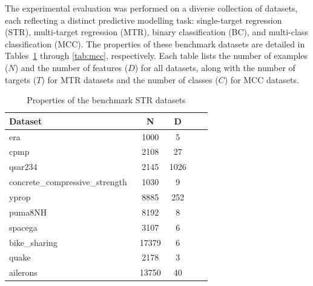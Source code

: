 \documentclass[3p,review,authoryear]{elsarticle}
\begin{document}
The experimental evaluation was performed on a diverse collection of datasets, each reflecting a distinct predictive modelling task: single-target regression (STR), multi-target regression (MTR), binary classification (BC), and multi-class classification (MCC).
The properties of these benchmark datasets are detailed in Tables~\ref{tab:str} through \ref{tab:mcc}, respectively.
Each table lists the number of examples (\(N\)) and the number of features (\(D\)) for all datasets, along with the number of targets (\(T\)) for MTR datasets and the number of classes (\(C\)) for MCC datasets.

\begin{table}[h!]
\centering
\caption{Properties of the benchmark STR datasets}
\label{tab:str}
\begin{tabular}{@{}lcccc@{}}
\toprule
\textbf{Dataset}   & \textbf{N} & \textbf{D} \\ \midrule
era~\citep{openml}                  & 1000         & 5          \\
cpmp~\citep{openml}                     & 2108         & 27          \\
qsar234~\citep{openml}                   & 2145         & 1026             \\
concrete\_compressive\_strength~\citep{openml}                   & 1030         & 9          \\
yprop~\citep{openml}                   & 8885         & 252       \\
puma8NH~\citep{openml}                & 8192         & 8        \\
spacega~\citep{openml}                  & 3107         & 6             \\
bike\_sharing~\citep{openml}           & 17379         & 6            \\
quake~\citep{openml}       & 2178         & 3         \\
ailerons~\citep{openml}         & 13750         & 40           \\ \bottomrule
\end{tabular}
\end{table}
\end{document}
